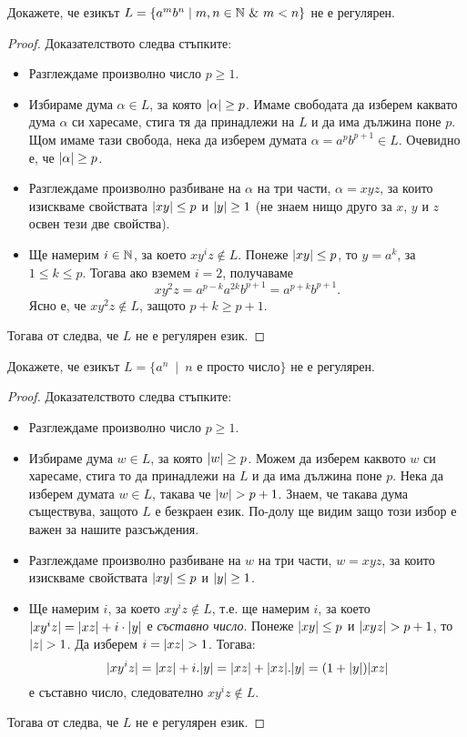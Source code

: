 \begin{problem}
  Докажете, че езикът $L = \{a^mb^n \mid m,n\in \mathbb{N}\ \&\ m < n\}$ не е регулярен.
\end{problem}
\begin{proof}
  Доказателството следва стъпките:
  \begin{itemize}
  \item 
    Разглеждаме произволно число $p \geq 1$.
  \item
    Избираме дума $\alpha \in L$, за която $\lvert{\alpha}\rvert \geq p$. Имаме свободата да изберем каквато дума $\alpha$
    си харесаме, стига тя да принадлежи на $L$ и да има дължина поне $p$.
    Щом имаме тази свобода, нека да изберем думата $\alpha = a^{p}b^{p+1} \in L$. Очевидно е, че $\lvert{\alpha}\rvert \geq p$.
  \item
    Разглеждаме произволно разбиване на $\alpha$ на три части, $\alpha = xyz$,
    за които изискваме свойствата $\lvert{xy}\rvert \leq p$ и $\lvert{y}\rvert \geq 1$ (не знаем нищо друго за $x$, $y$ и $z$ освен тези две свойства).
  \item
    Ще намерим $i\in\mathbb{N}$, за което $xy^iz \not\in L$.
    Понеже $\lvert{xy}\rvert \leq p$, то $y = a^k$, за  $1\leq k \leq p$.
    Тогава ако вземем $i = 2$, получаваме 
    \[xy^2z = a^{p-k}a^{2k}b^{p+1} = a^{p+k}b^{p+1}.\]
    Ясно е, че $xy^2z \not\in L$, защото $p+k \geq p+1$.
  \end{itemize}
  Тогава от  следва, че $L$ не е регулярен език.
\end{proof}

\begin{problem}
  Докажете, че езикът $L = \{a^n\ \mid\ n\mbox{ е просто число}\}$ не е регулярен.
\end{problem}
\begin{proof}
  Доказателството следва стъпките:
  \begin{itemize}
  \item 
    Разглеждаме произволно число $p \geq 1$.
  \item
    Избираме дума $w \in L$, за която $\lvert{w}\rvert \geq p$. Можем да изберем каквото $w$ 
    си харесаме, стига то да принадлежи на $L$ и да има дължина поне $p$.
    Нека да изберем думата $w \in L$, такава че $\lvert{w}\rvert > p+1$.
    Знаем, че такава дума съществува, защото $L$ е безкраен език. По-долу ще видим защо този избор е важен за нашите разсъждения.
  \item
    Разглеждаме произволно разбиване на $w$ на три части, $w = xyz$,
    за които изискваме свойствата $\lvert{xy}\rvert \leq p$ и $\lvert{y}\rvert \geq 1$.
  \item
    Ще намерим $i$, за което $xy^iz \not\in L$,
    т.е. ще намерим $i$, за което 
    $\lvert{xy^iz}\rvert = \lvert{xz}\rvert + i\cdot\lvert{y}\rvert$ е {\em съставно число}.
    Понеже $\lvert{xy}\rvert \leq p$ и $\lvert{xyz}\rvert > p+1$, то $\lvert{z}\rvert > 1$.
    Да изберем $i = \lvert{xz}\rvert > 1$. Тогава:
    \[\lvert{xy^iz}\rvert = \lvert{xz}\rvert + i.\lvert{y}\rvert = \lvert{xz}\rvert + \lvert{xz}\rvert.\lvert{y}\rvert = (1 + \lvert{y}\rvert)\lvert{xz}\rvert\] е съставно число, следователно 
    $xy^iz \not\in L$.
  \end{itemize}
  Тогава от  следва, че $L$ не е регулярен език.
\end{proof}

